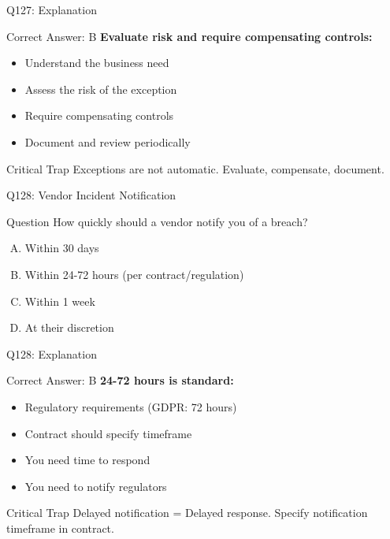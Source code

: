 \documentclass{beamer}
\begin{document}
	\begin{frame}{Q127: Explanation}
		\begin{block}{Correct Answer: B}
			\textbf{Evaluate risk and require compensating controls:}
			\begin{itemize}
				\item Understand the business need
				\item Assess the risk of the exception
				\item Require compensating controls
				\item Document and review periodically
			\end{itemize}
		\end{block}
		\begin{alertblock}{Critical Trap}
			Exceptions are not automatic.
			Evaluate, compensate, document.
		\end{alertblock}
	\end{frame}
	
	\begin{frame}{Q128: Vendor Incident Notification}
		\begin{block}{Question}
			How quickly should a vendor notify you of a breach?
		\end{block}
		\begin{enumerate}[(A)]
			\item Within 30 days
			\item Within 24-72 hours (per contract/regulation)
			\item Within 1 week
			\item At their discretion
		\end{enumerate}
	\end{frame}
	
	\begin{frame}{Q128: Explanation}
		\begin{block}{Correct Answer: B}
			\textbf{24-72 hours is standard:}
			\begin{itemize}
				\item Regulatory requirements (GDPR: 72 hours)
				\item Contract should specify timeframe
				\item You need time to respond
				\item You need to notify regulators
			\end{itemize}
		\end{block}
		\begin{alertblock}{Critical Trap}
			Delayed notification = Delayed response.
			Specify notification timeframe in contract.
		\end{alertblock}
	\end{frame}
	
\end{document}
